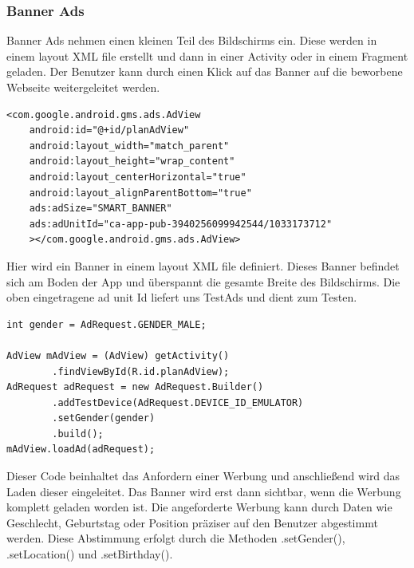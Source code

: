 \documentclass[FIPLY_base.tex]{subfiles}
\begin{document}
\newpage
\subsubsection{Banner Ads}
Banner Ads nehmen einen kleinen Teil des Bildschirms ein. Diese werden in einem layout XML file erstellt und dann in einer Activity oder in einem Fragment geladen. Der Benutzer kann durch einen Klick auf das Banner auf die beworbene Webseite weitergeleitet werden. 
\ \\
\begin{lstlisting}
<com.google.android.gms.ads.AdView
    android:id="@+id/planAdView"
    android:layout_width="match_parent"
    android:layout_height="wrap_content"
    android:layout_centerHorizontal="true"
    android:layout_alignParentBottom="true"
    ads:adSize="SMART_BANNER"
    ads:adUnitId="ca-app-pub-3940256099942544/1033173712"
    ></com.google.android.gms.ads.AdView>
\end{lstlisting}
Hier wird ein Banner in einem layout XML file definiert. Dieses Banner befindet sich am Boden der App und überspannt die gesamte Breite des Bildschirms.
Die oben eingetragene ad unit Id liefert uns TestAds und dient zum Testen.
\ \\
\begin{lstlisting}
int gender = AdRequest.GENDER_MALE;

AdView mAdView = (AdView) getActivity()
        .findViewById(R.id.planAdView);
AdRequest adRequest = new AdRequest.Builder()
        .addTestDevice(AdRequest.DEVICE_ID_EMULATOR)
        .setGender(gender)
        .build();
mAdView.loadAd(adRequest);
\end{lstlisting}
Dieser Code beinhaltet das Anfordern einer Werbung und anschließend wird das Laden dieser eingeleitet.
Das Banner wird erst dann sichtbar, wenn die Werbung komplett geladen worden ist. 
Die angeforderte Werbung kann durch Daten wie Geschlecht, Geburtstag oder Position präziser auf den Benutzer abgestimmt werden.
Diese Abstimmung erfolgt durch die Methoden .setGender(), .setLocation() und .setBirthday().	

\newpage
\end{document}
